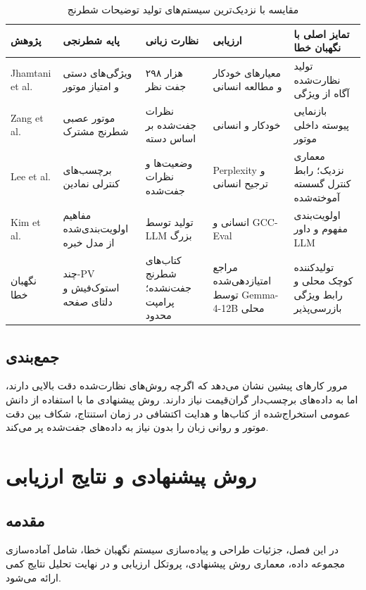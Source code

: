 \documentclass[a4paper,12pt]{report}
\begin{document}
\begin{table}[htbp]
\centering
\caption{مقایسه با نزدیک‌ترین سیستم‌های تولید توضیحات شطرنج}
\label{tab:related-comparison}
\begin{tabular}{@{}p{2.2cm}p{2.2cm}p{2.2cm}p{2.2cm}p{2.5cm}@{}}
\toprule
\textbf{پژوهش} & \textbf{پایه شطرنجی} & \textbf{نظارت زبانی} & \textbf{ارزیابی} & \textbf{تمایز اصلی با نگهبان خطا} \\
\midrule
Jhamtani et al. & ویژگی‌های دستی و امتیاز موتور & ۲۹۸ هزار جفت نظر & معیارهای خودکار و مطالعه انسانی & تولید نظارت‌شده آگاه از ویژگی \\
Zang et al. & موتور عصبی شطرنج مشترک & نظرات جفت‌شده بر اساس دسته & خودکار و انسانی & بازنمایی پیوسته داخلی موتور \\
Lee et al. & برچسب‌های کنترلی نمادین & وضعیت‌ها و نظرات جفت‌شده & Perplexity و ترجیح انسانی & معماری نزدیک؛ رابط کنترل گسسته آموخته‌شده \\
Kim et al. & مفاهیم اولویت‌بندی‌شده از مدل خبره & تولید توسط LLM بزرگ & انسانی و GCC-Eval & اولویت‌بندی مفهوم و داور LLM \\
نگهبان خطا & چند-PV استوک‌فیش و دلتای صفحه & کتاب‌های شطرنج جفت‌نشده؛ پرامپت محدود & مراجع امتیازدهی‌شده توسط Gemma-4-12B محلی & تولیدکننده کوچک محلی و رابط ویژگی بازرسی‌پذیر \\
\bottomrule
\end{tabular}
\end{table}

\section{جمع‌بندی}
مرور کارهای پیشین نشان می‌دهد که اگرچه روش‌های نظارت‌شده دقت بالایی دارند، اما به داده‌های برچسب‌دار گران‌قیمت نیاز دارند. روش پیشنهادی ما با استفاده از دانش عمومی استخراج‌شده از کتاب‌ها و هدایت اکتشافی در زمان استنتاج، شکاف بین دقت موتور و روانی زبان را بدون نیاز به داده‌های جفت‌شده پر می‌کند.

\chapter{روش پیشنهادی و نتایج ارزیابی}
\section{مقدمه}
در این فصل، جزئیات طراحی و پیاده‌سازی سیستم نگهبان خطا، شامل آماده‌سازی مجموعه داده، معماری روش پیشنهادی، پروتکل ارزیابی و در نهایت تحلیل نتایج کمی ارائه می‌شود.
\end{document}
